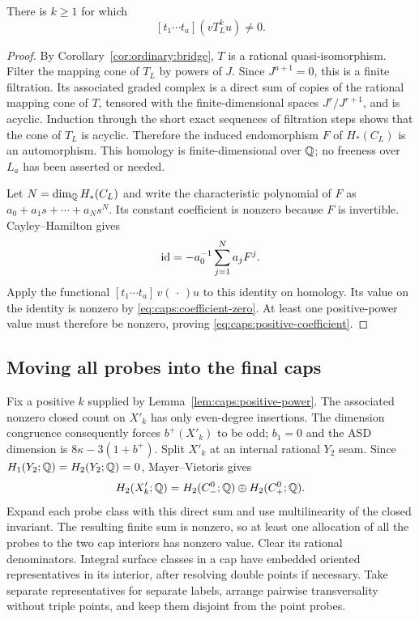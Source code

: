 \begin{lemma}\label{lem:caps:positive-power}
There is $k\ge1$ for which
\begin{equation}\label{eq:caps:positive-coefficient}
                    [t_1\cdots t_a](vT_L^ku)\ne0.
\end{equation}
\end{lemma}

\begin{proof}
By Corollary~\ref{cor:ordinary:bridge}, $T$ is a rational
quasi-isomorphism.  Filter the mapping cone of $T_L$ by powers of $J$.
Since $J^{a+1}=0$, this is a finite filtration.  Its associated graded
complex is a direct sum of copies of the rational mapping cone of $T$,
tensored with the finite-dimensional spaces $J^r/J^{r+1}$, and is
acyclic.  Induction through the short exact sequences of filtration
steps shows that the cone of $T_L$ is acyclic.  Therefore the induced
endomorphism $F$ of $H_*(C_L)$ is an automorphism.  This homology is
finite-dimensional over $\mathbb Q$; no freeness over $L_a$ has been asserted
or needed.

Let $N=\dim_\mathbb Q H_*(C_L)$ and write the characteristic polynomial of
$F$ as $a_0+a_1s+\cdots+a_Ns^N$.  Its constant coefficient is nonzero
because $F$ is invertible.  Cayley--Hamilton gives
\begin{equation}\label{eq:caps:cayley-hamilton}
               \operatorname{id}=-a_0^{-1}\sum_{j=1}^Na_jF^j.
\end{equation}
Apply the functional $[t_1\cdots t_a]\,v(\,\cdot\,)u$ to this
identity on homology.  Its value on the identity is nonzero by
\eqref{eq:caps:coefficient-zero}.  At least one positive-power value
must therefore be nonzero, proving \eqref{eq:caps:positive-coefficient}.
\end{proof}

\subsection{Moving all probes into the final caps}

Fix a positive $k$ supplied by Lemma~\ref{lem:caps:positive-power}.
The associated nonzero closed count on $X'_k$ has only even-degree
insertions.  The dimension congruence consequently forces $b^+(X'_k)$
to be odd; $b_1=0$ and the ASD dimension is
$8\kappa-3(1+b^+)$.  Split $X'_k$ at an internal rational $Y_2$ seam.
Since $H_1(Y_2;\mathbb Q)=H_2(Y_2;\mathbb Q)=0$, Mayer--Vietoris gives
\begin{equation}\label{eq:caps:homology-split}
 H_2(X'_k;\mathbb Q)=H_2(C_-^0;\mathbb Q)\oplus H_2(C_+^0;\mathbb Q).
\end{equation}
Expand each probe class with this direct sum and use multilinearity of
the closed invariant.  The resulting finite sum is nonzero, so at least
one allocation of all the probes to the two cap interiors has nonzero
value.  Clear its rational denominators.  Integral surface classes in a
cap have embedded oriented representatives in its interior, after
resolving double points if necessary.  Take separate representatives for
separate labels, arrange pairwise transversality without triple points,
and keep them disjoint from the point probes.

